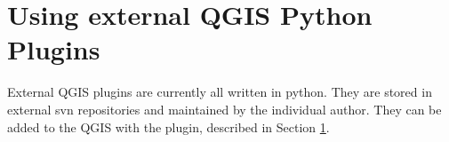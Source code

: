 \section{Using external QGIS Python Plugins}\label{sec:external_plugins}

\updatedisclaimer

External QGIS plugins are currently all written in python. They are stored 
in external svn repositories and maintained by the individual author. They 
can be added to the QGIS  with the 
 plugin, described in Section 
\ref{sec:external_plugins}.


